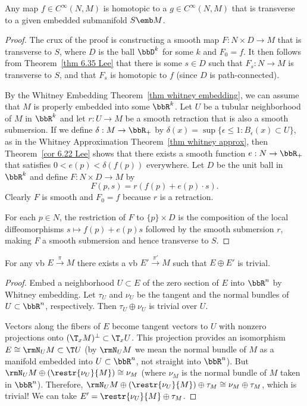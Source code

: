 \begin{thm}\label{transverse homotopy thm}
Any map $f\in C^\infty(N,M)$ is homotopic to a $g\in C^\infty(N,M)$ that is transverse to a given embedded submanifold $S\emb M$.
\end{thm}
\begin{proof}
The crux of the proof is constructing a smooth map $F:N\times D\to M$ that is transverse to $S$, where $D$ is the ball $\bbD^k$ for some $k$ and $F_0=f$. It then follows from Theorem~\ref{thm 6.35 Lee} that there is some $s\in D$ such that $F_s:N\to M$ is transverse to $S$, and that $F_s$ is homotopic to $f$ (since $D$ is path-connected).

By the Whitney Embedding Theorem~\ref{thm whitney embedding}, we can assume that $M$ is properly embedded into some $\bbR^k$. Let $U$ be a tubular neighborhood of $M$ in $\bbR^k$ and let $r:U\to M$ be a smooth retraction that is also a smooth submersion. If we define $\delta:M\to \bbR_+$ by $\delta(x)=\sup\{\epsilon\leq 1:B_\epsilon(x)\subset U\}$, as in the Whitney Approximation Theorem~\ref{thm whitney approx}, then Theorem~\ref{cor 6.22 Lee} shows that there exists a smooth function $e:N\to \bbR_+$ that satisfies $0<e(p)<\delta(f(p))$ everywhere. Let $D$ be the unit ball in $\bbR^k$ and define $F:N\times D\to M$ by
\[F(p,s)=r(f(p)+e(p)\cdot s).\]
Clearly  $F$ is smooth and $F_0=f$ because $r$ is a retraction. 

For each $p\in N$, the restriction of $F$ to $\{p\}\times D$ is the composition of the local diffeomorphisms $s\mapsto f(p)+e(p)s$ followed by the smooth submersion $r$, making $F$ a smooth submersion and hence transverse to $S$.
\end{proof}


\begin{thm}\label{every VB is summand of trivial VB}
    For any \gls{vb} $E\overset{\pi}{\to} M$ there exists a \gls{vb} $E'\overset{\pi'}{\to} M$ such that $E\oplus E'$ is trivial.
\end{thm}
\begin{proof}
    Embed a neighborhood $U\subset E$ of the zero section of $E$ into $\bbR^n$ by Whitney embedding. Let $\tau_U$ and $\nu_U$ be the tangent and the normal bundles of $U\subset \bbR^n$, respectively. Then $\tau_U\oplus \nu_U$ is trivial over $U$.
    
    Vectors along the fibers of $E$ become tangent vectors to $U$ with nonzero projections onto $(\T_x M)^\perp\subset \T_x U$. This projection provides an isomorphism $E\cong \rmN_U M\subset \T U$ (by $\rmN_U M$ we mean the normal bundle of $M$ as a manifold embedded into $U\subset \bbR^n$, not straight into $\bbR^n$). But $\rmN_U M\oplus (\restr{\nu_U}{M})\cong \nu_M$ (where $\nu_M$ is the normal bundle of $M$ taken in $\bbR^n$). Therefore, $\rmN_U M\oplus (\restr{\nu_U}{M})\oplus \tau_M\cong \nu_M\oplus \tau_M $, which is trivial! We can take $E'=\restr{\nu_U}{M}\oplus \tau_M$.
\end{proof}

